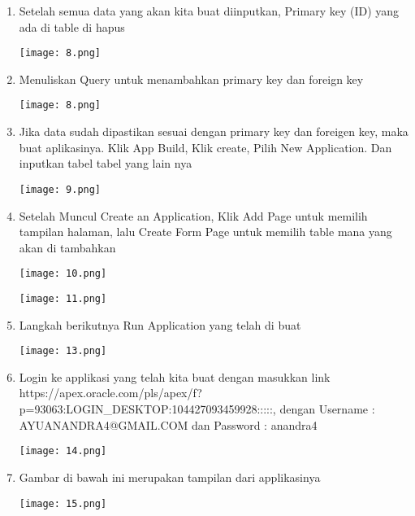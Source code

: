 \documentclass{article}
\begin{document}
\begin{enumerate}
    \item {Setelah semua data yang akan kita buat diinputkan, Primary key (ID) yang ada di table di hapus}
    \begin{center}
        \texttt{[image: 8.png]}
    \end{center}
    
    \item {Menuliskan Query untuk menambahkan primary key dan foreign key}
     \begin{center}
        \texttt{[image: 8.png]}
    \end{center}
     
    \item {Jika data sudah dipastikan sesuai dengan primary key dan foreigen key, maka buat aplikasinya. Klik App Build, Klik create, Pilih New Application. Dan inputkan tabel tabel yang lain nya}
    \begin{center}
        \texttt{[image: 9.png]}
     \end{center}
     
    \item {Setelah Muncul Create an Application, Klik Add Page untuk memilih tampilan halaman, lalu Create Form Page untuk memilih table mana yang akan di tambahkan}
     \begin{center}
        \texttt{[image: 10.png]}
    \end{center}
    
     \begin{center}
        \texttt{[image: 11.png]}
    \end{center}
    
    \item {Langkah berikutnya Run Application yang telah di buat}
    \begin{center}
        \texttt{[image: 13.png]}
    \end{center}
    
    \item {Login ke applikasi yang telah kita buat dengan masukkan link https://apex.oracle.com/pls/apex/f?p=93063:LOGIN_DESKTOP:104427093459928:::::, dengan Username : AYUANANDRA4@GMAIL.COM dan Password : anandra4} 
    \begin{center}
        \texttt{[image: 14.png]}
    \end{center}
    
    \item {Gambar di bawah ini merupakan tampilan dari applikasinya}
    \begin{center}
        \texttt{[image: 15.png]}
    \end{center}
    
    \end{enumerate}
\end{document}
